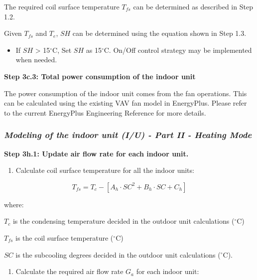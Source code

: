 The required coil surface temperature \(T_{fs}\) can be determined as described in Step 1.2.

Given \(T_{fs}\) and \(T_e\), \(SH\) can be determined using the equation shown in Step 1.3.

\begin{itemize}
\tightlist
\item
  If \(SH\) \textgreater{} 15\(^{\circ}\)C, Set \(SH\) as 15\(^{\circ}\)C. On/Off control strategy may be implemented when needed.
\end{itemize}

\textbf{Step 3c.3: Total power consumption of the indoor unit}

The power consumption of the indoor unit comes from the fan operations. This can be calculated using the existing VAV fan model in EnergyPlus. Please refer to the current EnergyPlus Engineering Reference for more details.

\subsubsection{\emph{Modeling of the indoor unit (I/U) - Part II - Heating Mode}}\label{modeling-of-the-indoor-unit-iu---part-ii---heating-mode}

\textbf{Step 3h.1: Update air flow rate for each indoor unit.}

\begin{enumerate}
\def\labelenumi{\arabic{enumi})}
\tightlist
\item
  Calculate coil surface temperature for all the indoor units:
\end{enumerate}

\begin{equation}
T_{fs} = T_c-[A_h\cdot SC^2+B_h\cdot SC+C_h]
\end{equation}

where:

\(T_c\) is the condensing temperature decided in the outdoor unit calculations (\(^{\circ}\)C)

\(T_{fs}\) is the coil surface temperature (\(^{\circ}\)C)

\(SC\) is the subcooling degrees decided in the outdoor unit calculations (\(^{\circ}\)C).

\begin{enumerate}
\def\labelenumi{\arabic{enumi})}
\setcounter{enumi}{1}
\tightlist
\item
  Calculate the required air flow rate \(G_a\) for each indoor unit:
\end{enumerate}

